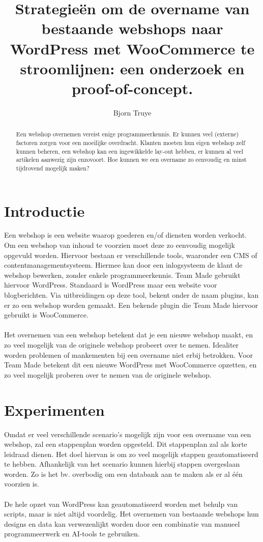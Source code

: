 \documentclass[a0,portrait]{hogent-poster}
\title{Strategieën om de overname van bestaande webshops naar WordPress met WooCommerce te stroomlijnen: een onderzoek en proof-of-concept.}
\author{Bjorn Truye}
\begin{document}
\maketitle

\begin{abstract}
    Een webshop overnemen vereist enige programmeerkennis. Er kunnen veel (externe) factoren zorgen voor een moeilijke overdracht. Klanten moeten hun eigen webshop zelf kunnen beheren, een webshop kan een ingewikkelde lay-out hebben, er kunnen al veel artikelen aanwezig zijn enzovoort. Hoe kunnen we een overname zo eenvoudig en minst tijdrovend mogelijk maken?
\end{abstract}

\begin{multicols}{2} %

\section{Introductie}
Een webshop is een website waarop goederen en/of diensten worden verkocht. Om een webshop van inhoud te voorzien moet deze zo eenvoudig mogelijk opgevuld worden. Hiervoor bestaan er verschillende tools, waaronder een CMS of contentmanagementsysteem. Hiermee kan door een inlogsysteem de klant de webshop bewerken, zonder enkele programmeerkennis. Team Made gebruikt hiervoor WordPress. Standaard is WordPress maar een website voor blogberichten. Via uitbreidingen op deze tool, bekent onder de naam plugins, kan er zo een webshop worden gemaakt. Een bekende plugin die Team Made hiervoor gebruikt is WooCommerce. 
\\\\
Het overnemen van een webshop betekent dat je een nieuwe webshop maakt, en zo veel mogelijk van de originele webshop probeert over te nemen. Idealiter worden problemen of mankementen bij een overname niet erbij betrokken. Voor Team Made betekent dit een nieuwe WordPress met WooCommerce opzetten, en zo veel mogelijk proberen over te nemen van de originele webshop.

\section{Experimenten}

Omdat er veel verschillende scenario’s mogelijk zijn voor een overname van een webshop, zal een stappenplan worden opgesteld. Dit stappenplan zal als korte leidraad
dienen. Het doel hiervan is om zo veel mogelijk stappen geautomatiseerd te hebben. Afhankelijk van het scenario kunnen hierbij stappen overgeslaan worden. Zo is het bv. overbodig om een databank aan te maken als er al één voorzien is. 
\\\\
De hele opzet van WordPress kan geautomatiseerd worden met behulp van scripts, maar is niet altijd voordelig. Het overnemen van bestaande webshops hun designs en data kan verwezenlijkt worden door een combinatie van manueel programmeerwerk en AI-tools te gebruiken.


\end{multicols}
\end{document}
